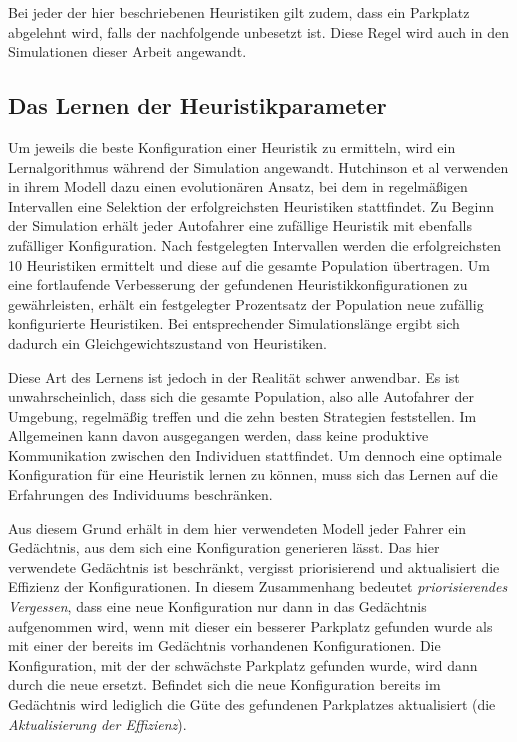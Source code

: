 Bei jeder der hier beschriebenen Heuristiken gilt zudem, dass ein Parkplatz abgelehnt wird, falls der nachfolgende unbesetzt ist. Diese Regel wird auch in den Simulationen dieser Arbeit angewandt.

\subsection{Das Lernen der Heuristikparameter}
Um jeweils die beste Konfiguration einer Heuristik zu ermitteln, wird ein Lernalgorithmus während der Simulation angewandt. Hutchinson et al \cite[The Evolutionary Algorithm, S. 14]{hutchinson} verwenden in ihrem Modell dazu einen evolutionären Ansatz, bei dem in regelmäßigen Intervallen eine Selektion der erfolgreichsten Heuristiken stattfindet. Zu Beginn der Simulation erhält jeder Autofahrer eine zufällige Heuristik mit ebenfalls zufälliger Konfiguration. Nach festgelegten Intervallen werden die erfolgreichsten 10 Heuristiken ermittelt und diese auf die gesamte Population übertragen. Um eine fortlaufende Verbesserung der gefundenen Heuristikkonfigurationen zu gewährleisten, erhält ein festgelegter Prozentsatz der Population neue zufällig konfigurierte Heuristiken. Bei entsprechender Simulationslänge ergibt sich dadurch ein Gleichgewichtszustand von Heuristiken. 

Diese Art des Lernens ist jedoch in der Realität schwer anwendbar. Es ist unwahrscheinlich, dass sich die gesamte Population, also alle Autofahrer der Umgebung, regelmäßig treffen und die zehn besten Strategien feststellen. Im Allgemeinen kann davon ausgegangen werden, dass keine produktive Kommunikation zwischen den Individuen stattfindet. Um dennoch eine optimale Konfiguration für eine Heuristik lernen zu können, muss sich das Lernen auf die Erfahrungen des Individuums beschränken. 

Aus diesem Grund erhält in dem hier verwendeten Modell jeder Fahrer ein Gedächtnis, aus dem sich eine Konfiguration generieren lässt. Das hier verwendete Gedächtnis ist beschränkt, vergisst priorisierend und aktualisiert die Effizienz der Konfigurationen. In diesem Zusammenhang bedeutet \emph{priorisierendes Vergessen}, dass eine neue Konfiguration nur dann in das Gedächtnis aufgenommen wird, wenn mit dieser ein besserer Parkplatz gefunden wurde als mit einer der bereits im Gedächtnis vorhandenen Konfigurationen. Die Konfiguration, mit der der schwächste Parkplatz gefunden wurde, wird dann durch die neue ersetzt. Befindet sich die neue Konfiguration bereits im Gedächtnis wird lediglich die Güte des gefundenen Parkplatzes aktualisiert (die \emph{Aktualisierung der Effizienz}).

